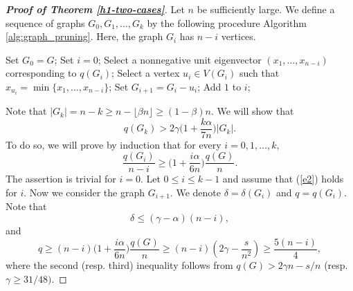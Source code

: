 \documentclass[11pt,a4paper]{article}
\theoremstyle{plain}
\theoremstyle{definition}
\begin{document}
\begin{proof}[{\bf Proof of Theorem \ref{h1-two-cases}}]
 Let $n$ be sufficiently large.
We define a sequence of graphs $G_{0},G_1,\ldots, G_{k}$ by the following procedure Algorithm \ref{alg:graph_pruning}. Here, the graph $G_i$ has $n-i$ vertices. 

\begin{algorithm}[H] 
\caption{Graph Reduction Algorithm}
\label{alg:graph_pruning}
\begin{algorithmic}[1]
    \STATE Set $G_0 = G$;
    \STATE Set $i = 0$;
        \STATE Select a nonnegative unit eigenvector $(x_1, \ldots, x_{n-i})$ corresponding to $q(G_i)$;
        \STATE Select a vertex $u_i \in V(G_i)$ such that $x_{u_i} = \min\{x_1, \ldots, x_{n-i}\}$;
        \STATE Set $G_{i+1} = G_i - u_i$;
        \STATE Add $1$ to $i$;
    \ENDWHILE 
\end{algorithmic}
\end{algorithm} 
Note that $|G_k|=n-k\geq n- \lfloor\beta n\rfloor\geq(1-\beta)n$. 
We will show that
\begin{equation}\label{e1}
q(G_k)>2\gamma\bigg(1+\frac{k\alpha}{7n}\bigg)|G_k|.
\end{equation} 
To do so, we will prove by induction that 
for every $i=0,1, \ldots,k$, 
\begin{equation}\label{e2}
\frac{q(G_{i})}{n-i}\geq\bigg(1+\frac{i\alpha}{6n}\bigg)\frac{q(G)}{n}.
\end{equation}
The assertion is trivial for $i=0$. Let $0\leq i\leq k-1$ and assume that (\ref{e2}) holds for $i$. Now we consider the graph $G_{i+1}$.  
We denote $\delta=\delta(G_{i})$ and $q=q(G_{i})$. Note  that 
\begin{equation}\label{e3}
\delta\leq (\gamma-\alpha)(n-i),
\end{equation}
and
\begin{equation}\label{e4}
q\geq (n-i)\bigg(1+\frac{i\alpha}{6n}\bigg)\frac{q(G)}{n}\geq (n-i)
\left(2\gamma- \frac{s}{n^{2}}\right)\geq 
\frac{5(n-i)}{4},
\end{equation} 
where the second (resp. third) inequality follows from $q(G)>2\gamma n- s/n$ (resp. $\gamma\geq31/48)$. 


\end{proof}
\end{document}
